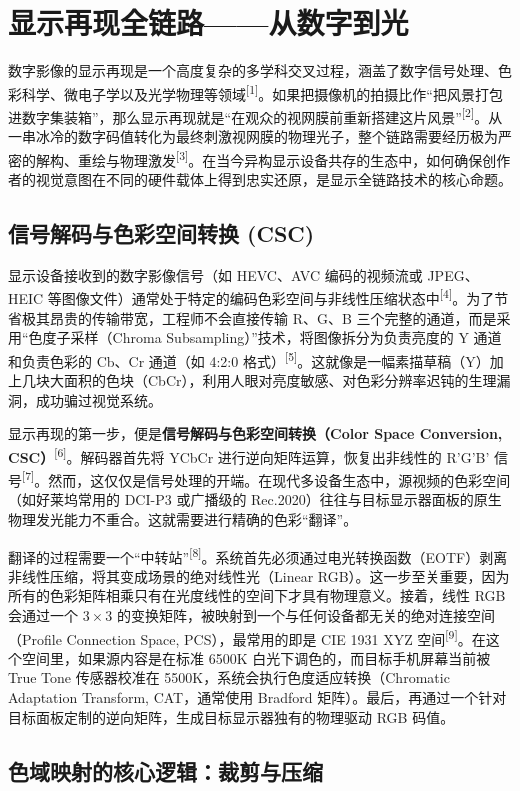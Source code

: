 \documentclass[12pt, a4paper]{ctexart}
\newcommand{\scite}[1]{\textsuperscript{[#1]}}
\begin{document}
\newpage
\section{显示再现全链路——从数字到光}

数字影像的显示再现是一个高度复杂的多学科交叉过程，涵盖了数字信号处理、色彩科学、微电子学以及光学物理等领域\scite{1}。如果把摄像机的拍摄比作“把风景打包进数字集装箱”，那么显示再现就是“在观众的视网膜前重新搭建这片风景”\scite{2}。从一串冰冷的数字码值转化为最终刺激视网膜的物理光子，整个链路需要经历极为严密的解构、重绘与物理激发\scite{3}。在当今异构显示设备共存的生态中，如何确保创作者的视觉意图在不同的硬件载体上得到忠实还原，是显示全链路技术的核心命题。

\subsection{信号解码与色彩空间转换 (CSC)}

显示设备接收到的数字影像信号（如 HEVC、AVC 编码的视频流或 JPEG、HEIC 等图像文件）通常处于特定的编码色彩空间与非线性压缩状态中\scite{4}。为了节省极其昂贵的传输带宽，工程师不会直接传输 R、G、B 三个完整的通道，而是采用“色度子采样（Chroma Subsampling）”技术，将图像拆分为负责亮度的 Y 通道和负责色彩的 Cb、Cr 通道（如 4:2:0 格式）\scite{5}。这就像是一幅素描草稿（Y）加上几块大面积的色块（CbCr），利用人眼对亮度敏感、对色彩分辨率迟钝的生理漏洞，成功骗过视觉系统。

显示再现的第一步，便是\textbf{信号解码与色彩空间转换（Color Space Conversion, CSC）}\scite{6}。解码器首先将 YCbCr 进行逆向矩阵运算，恢复出非线性的 R'G'B' 信号\scite{7}。然而，这仅仅是信号处理的开端。在现代多设备生态中，源视频的色彩空间（如好莱坞常用的 DCI-P3 或广播级的 Rec.2020）往往与目标显示器面板的原生物理发光能力不重合。这就需要进行精确的色彩“翻译”。

翻译的过程需要一个“中转站”\scite{8}。系统首先必须通过电光转换函数（EOTF）剥离非线性压缩，将其变成场景的绝对线性光（Linear RGB）。这一步至关重要，因为所有的色彩矩阵相乘只有在光度线性的空间下才具有物理意义。接着，线性 RGB 会通过一个 $3 \times 3$ 的变换矩阵，被映射到一个与任何设备都无关的绝对连接空间（Profile Connection Space, PCS），最常用的即是 CIE 1931 XYZ 空间\scite{9}。在这个空间里，如果源内容是在标准 6500K 白光下调色的，而目标手机屏幕当前被 True Tone 传感器校准在 5500K，系统会执行色度适应转换（Chromatic Adaptation Transform, CAT，通常使用 Bradford 矩阵）。最后，再通过一个针对目标面板定制的逆向矩阵，生成目标显示器独有的物理驱动 RGB 码值。

\subsection{色域映射的核心逻辑：裁剪与压缩}
\end{document}
